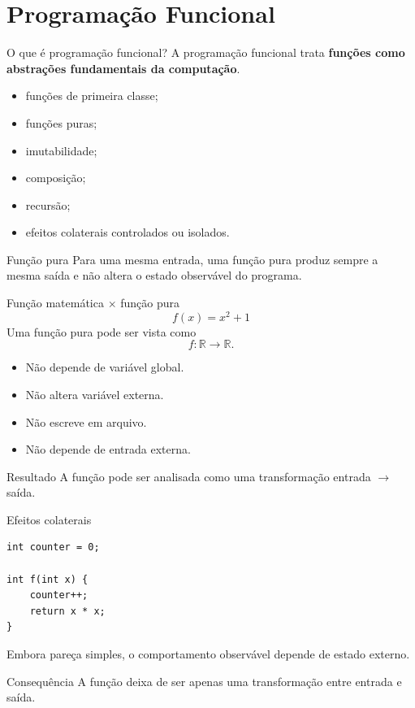 \documentclass[aspectratio=169,11pt]{beamer}
\begin{document}
\section{Programação Funcional}

\begin{frame}{O que é programação funcional?}
    A programação funcional trata \textbf{funções como abstrações fundamentais da computação}.
    \begin{itemize}
        \item funções de primeira classe;
        \item funções puras;
        \item imutabilidade;
        \item composição;
        \item recursão;
        \item efeitos colaterais controlados ou isolados.
    \end{itemize}
    \begin{block}{Função pura}
        Para uma mesma entrada, uma função pura produz sempre a mesma saída e não altera o estado observável do programa.
    \end{block}
\end{frame}

\begin{frame}{Função matemática $\times$ função pura}
    \[
        f(x)=x^2+1
    \]
    Uma função pura pode ser vista como
    \[
        f:\mathbb{R}\rightarrow\mathbb{R}.
    \]
    \begin{itemize}
        \item Não depende de variável global.
        \item Não altera variável externa.
        \item Não escreve em arquivo.
        \item Não depende de entrada externa.
    \end{itemize}
    \begin{block}{Resultado}
        A função pode ser analisada como uma transformação entrada $\rightarrow$ saída.
    \end{block}
\end{frame}

\begin{frame}[fragile]{Efeitos colaterais}
    \begin{lstlisting}
int counter = 0;

int f(int x) {
    counter++;
    return x * x;
}
\end{lstlisting}
    Embora pareça simples, o comportamento observável depende de estado externo.
    \begin{alertblock}{Consequência}
        A função deixa de ser apenas uma transformação entre entrada e saída.
    \end{alertblock}
\end{frame}
\end{document}
